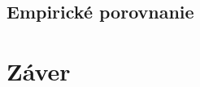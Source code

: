\documentclass[slovak, master]{diploma}
\begin{document}
\section{Empirické porovnanie}
\label{sec:Gameplay}

\chapter{Záver}
\label{sec:Conclusion}
%

\printbibliography[title={Literatúra}, heading=bibintoc]
\end{document}
